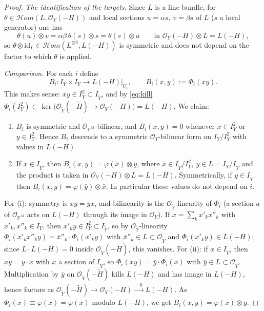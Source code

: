 \documentclass[11pt,twoside]{amsart}
\theoremstyle{plain}
\numberwithin{equation}{section}
\theoremstyle{definition}
\begin{document}
\begin{proof}
\emph{The identification of the targets.}
Since $L$ is a line bundle, for $\theta\in\mathcal{H}om(L,\mathcal{O}_Y(-H))$ and local sections
$u=\alpha s$, $v=\beta s$ of $L$ ($s$ a local generator) one has
\begin{equation}\label{eq:sym}
\theta(u)\otimes v=\alpha\beta\,\theta(s)\otimes s=\theta(v)\otimes u
\qquad\text{in } \mathcal{O}_Y(-H)\otimes L=L(-H),
\end{equation}
so $\theta\otimes\mathrm{id}_L\in\mathcal{H}om(L^{\otimes 2},L(-H))$ is symmetric and does not depend
on the factor to which $\theta$ is applied.

\emph{Comparison.}
For each $i$ define
\[
B_i\colon I_Y\times I_Y\longrightarrow L(-H)\big|_{U_i},\qquad B_i(x,y):=\Phi_i(xy).
\]
This makes sense: $xy\in I_Y^2\subset I_{\widetilde Y}$, and by \eqref{eq:kill}
$\Phi_i(I_Y^2)\subset\ker\big(\mathcal{O}_{\widetilde Y}(-\widetilde H)\to\mathcal{O}_Y(-H)\big)=L(-H)$.
We claim:
\begin{enumerate}
\item[(i)] $B_i$ is symmetric and $\mathcal{O}_{\mathbb{P}^M}$-bilinear, and $B_i(x,y)=0$ whenever
$x\in I_Y^2$ or $y\in I_Y^2$. Hence $B_i$ descends to a symmetric $\mathcal{O}_Y$-bilinear form on
$I_Y/I_Y^2$ with values in $L(-H)$.
\item[(ii)] If $x\in I_{\widetilde Y}$, then $B_i(x,y)=\varphi(\bar x)\otimes\bar y$, where
$\bar x\in I_{\widetilde Y}/I_Y^2$, $\bar y\in L=I_Y/I_{\widetilde Y}$ and the product is taken in
$\mathcal{O}_Y(-H)\otimes L=L(-H)$. Symmetrically, if $y\in I_{\widetilde Y}$ then
$B_i(x,y)=\varphi(\bar y)\otimes\bar x$. In particular these values do not depend on $i$.
\end{enumerate}
For (i): symmetry is $xy=yx$, and bilinearity is the $\mathcal{O}_{\widetilde Y}$-linearity of $\Phi_i$
(a section $a$ of $\mathcal{O}_{\mathbb{P}^M}$ acts on $L(-H)$ through its image in $\mathcal{O}_Y$).
If $x=\sum_k x'_k x''_k$ with $x'_k,x''_k\in I_Y$, then $x'_k y\in I_Y^2\subset I_{\widetilde Y}$, so by
$\mathcal{O}_{\widetilde Y}$-linearity $\Phi_i(x'_k x''_k y)=\bar x''_k\cdot\Phi_i(x'_k y)$ with
$\bar x''_k\in L\subset\mathcal{O}_{\widetilde Y}$ and $\Phi_i(x'_k y)\in L(-H)$; since
$L\cdot L(-H)=0$ inside $\mathcal{O}_{\widetilde Y}(-\widetilde H)$, this vanishes.
For (ii): if $x\in I_{\widetilde Y}$, then $xy=y\cdot x$ with $x$ a section of $I_{\widetilde Y}$, so
$\Phi_i(xy)=\bar y\cdot\Phi_i(x)$ with $\bar y\in L\subset\mathcal{O}_{\widetilde Y}$. Multiplication by
$\bar y$ on $\mathcal{O}_{\widetilde Y}(-\widetilde H)$ kills $L(-H)$ and has image in $L(-H)$, hence
factors as $\mathcal{O}_{\widetilde Y}(-\widetilde H)\to\mathcal{O}_Y(-H)\xrightarrow{\;\cdot\,\bar y\;}L(-H)$.
As $\Phi_i(x)\equiv\bar\varphi(x)=\varphi(\bar x)$ modulo $L(-H)$, we get
$B_i(x,y)=\varphi(\bar x)\otimes\bar y$.


\end{proof}
\end{document}
